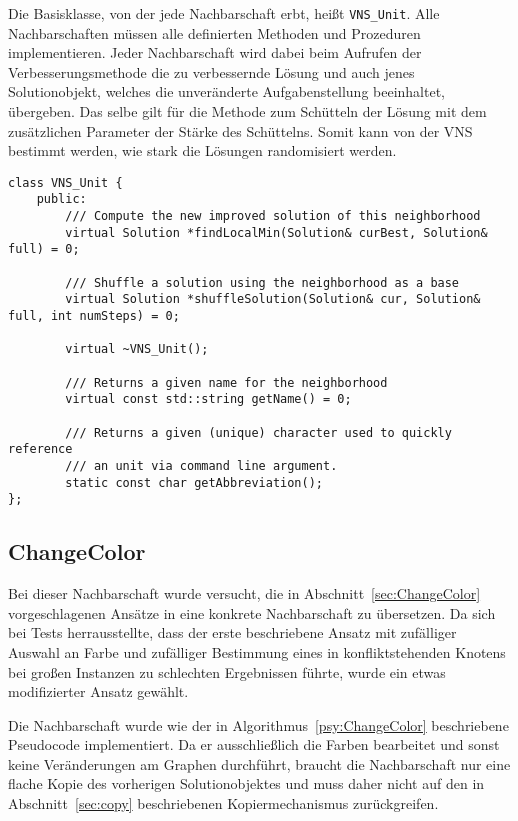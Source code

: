 Die Basisklasse, von der jede Nachbarschaft erbt, heißt \texttt{VNS\_Unit}. Alle Nachbarschaften müssen alle definierten Methoden und Prozeduren implementieren. Jeder Nachbarschaft wird dabei beim Aufrufen der
Verbesserungsmethode die zu verbessernde Lösung und auch jenes Solutionobjekt, welches die unveränderte Aufgabenstellung beeinhaltet, übergeben. Das selbe gilt für die Methode zum Schütteln der Lösung mit dem
zusätzlichen Parameter der Stärke des Schüttelns. Somit kann von der VNS bestimmt werden, wie stark die Lösungen randomisiert werden. 

\singlespacing
\begin{lstlisting}[caption={Signatur der Basisklasse \texttt{VNS\_Unit}, von welcher alle Nachbarschaften erben},label={lst:vnsunit}]
class VNS_Unit {
	public:
		/// Compute the new improved solution of this neighborhood
		virtual Solution *findLocalMin(Solution& curBest, Solution& full) = 0;

		/// Shuffle a solution using the neighborhood as a base
		virtual Solution *shuffleSolution(Solution& cur, Solution& full, int numSteps) = 0;

		virtual ~VNS_Unit();

		/// Returns a given name for the neighborhood
		virtual const std::string getName() = 0;

		/// Returns a given (unique) character used to quickly reference
		/// an unit via command line argument.
		static const char getAbbreviation();
};
\end{lstlisting}

\subsection{ChangeColor}
Bei dieser Nachbarschaft wurde versucht, die in Abschnitt~\ref{sec:ChangeColor} vorgeschlagenen Ansätze in eine konkrete Nachbarschaft zu übersetzen. Da sich bei Tests herrausstellte, dass der erste beschriebene Ansatz
mit zufälliger Auswahl an Farbe und zufälliger Bestimmung eines in konfliktstehenden Knotens bei großen Instanzen zu schlechten Ergebnissen führte, wurde ein etwas modifizierter Ansatz gewählt.

Die Nachbarschaft wurde wie der in Algorithmus~\ref{psy:ChangeColor} beschriebene Pseudocode implementiert. Da er ausschließlich die Farben bearbeitet und sonst keine Veränderungen am Graphen durchführt,
braucht die Nachbarschaft nur eine flache Kopie des vorherigen Solutionobjektes und muss daher nicht auf den in Abschnitt~\ref{sec:copy} beschriebenen Kopiermechanismus zurückgreifen. 

